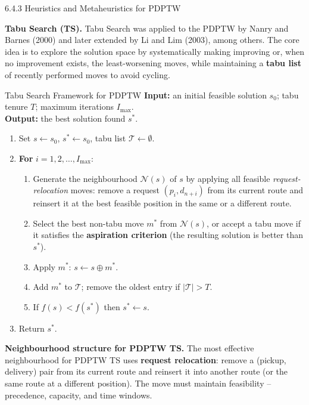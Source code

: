 \documentclass[aspectratio=169,10pt]{beamer}
\begin{document}
\begin{frame}[allowframebreaks]{6.4.3 Heuristics and Metaheuristics for PDPTW}
  \framebreak

  \textbf{Tabu Search (TS).}  Tabu Search was applied to the PDPTW by Nanry and Barnes
  (2000) and later extended by Li and Lim (2003), among others. The core idea is to
  explore the solution space by systematically making improving or, when no improvement
  exists, the least-worsening moves, while maintaining a \textbf{tabu list} of recently
  performed moves to avoid cycling.

  \begin{block}{Tabu Search Framework for PDPTW}
    \textbf{Input:} an initial feasible solution $s_0$; tabu tenure $T$; maximum
    iterations $I_{\max}$.\\
    \textbf{Output:} the best solution found $s^*$.
    \medskip

    \begin{enumerate}
      \item Set $s \leftarrow s_0$, $s^* \leftarrow s_0$, tabu list $\mathcal{T} \leftarrow \emptyset$.
      \item \textbf{For} $i = 1, 2, \ldots, I_{\max}$:
      \begin{enumerate}
        \item[a.] Generate the neighbourhood $\mathcal{N}(s)$ of $s$ by applying all
              feasible \emph{request-relocation} moves: remove a request $(p_i, d_{n+i})$
              from its current route and reinsert it at the best feasible position in
              the same or a different route.
        \item[b.] Select the best non-tabu move $m^*$ from $\mathcal{N}(s)$, or accept a
              tabu move if it satisfies the \textbf{aspiration criterion} (the resulting
              solution is better than $s^*$).
        \item[c.] Apply $m^*$: $s \leftarrow s \oplus m^*$.
        \item[d.] Add $m^*$ to $\mathcal{T}$; remove the oldest entry if $|\mathcal{T}| > T$.
        \item[e.] If $f(s) < f(s^*)$ then $s^* \leftarrow s$.
      \end{enumerate}
      \item Return $s^*$.
    \end{enumerate}
  \end{block}

  \framebreak

  \textbf{Neighbourhood structure for PDPTW TS.} The most effective neighbourhood for
  PDPTW TS uses \textbf{request relocation}: remove a (pickup, delivery) pair from its
  current route and reinsert it into another route (or the same route at a different
  position). The move must maintain feasibility -- precedence, capacity, and time windows.


\end{frame}
\end{document}
